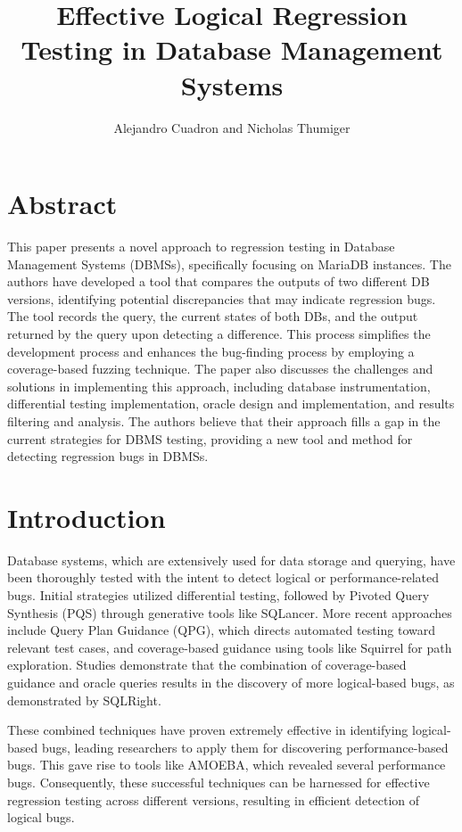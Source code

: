 \documentclass[sigconf]{acmart}
\author[]{}
\begin{document}
\title{Effective Logical Regression Testing in Database Management Systems}
\author{Alejandro Cuadron and Nicholas Thumiger}

\maketitle

\section{Abstract}
This paper presents a novel approach to regression testing in Database Management Systems (DBMSs), specifically focusing on MariaDB instances. The authors have developed a tool that compares the outputs of two different DB versions, identifying potential discrepancies that may indicate regression bugs. The tool records the query, the current states of both DBs, and the output returned by the query upon detecting a difference. This process simplifies the development process and enhances the bug-finding process by employing a coverage-based fuzzing technique. The paper also discusses the challenges and solutions in implementing this approach, including database instrumentation, differential testing implementation, oracle design and implementation, and results filtering and analysis. The authors believe that their approach fills a gap in the current strategies for DBMS testing, providing a new tool and method for detecting regression bugs in DBMSs.
\section{Introduction}
Database systems, which are extensively used for data storage and querying, have been thoroughly tested with the intent to detect logical or performance-related bugs. Initial strategies utilized differential testing, followed by Pivoted Query Synthesis (PQS) through generative tools like SQLancer. More recent approaches include Query Plan Guidance (QPG), which directs automated testing toward relevant test cases, and coverage-based guidance using tools like Squirrel for path exploration. Studies demonstrate that the combination of coverage-based guidance and oracle queries results in the discovery of more logical-based bugs, as demonstrated by SQLRight.

These combined techniques have proven extremely effective in identifying logical-based bugs, leading researchers to apply them for discovering performance-based bugs. This gave rise to tools like AMOEBA, which revealed several performance bugs. Consequently, these successful techniques can be harnessed for effective regression testing across different versions, resulting in efficient detection of logical bugs.
\end{document}
